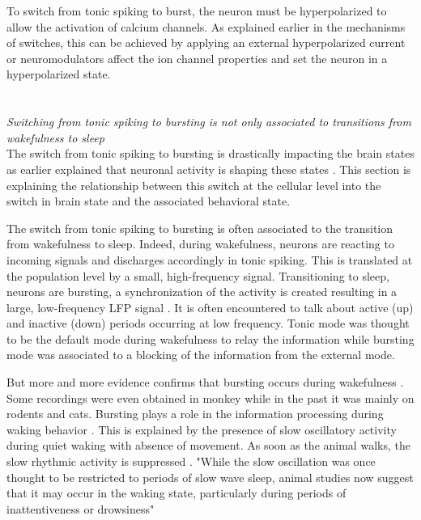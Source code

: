 To switch from tonic spiking to burst, the neuron must be hyperpolarized to allow the activation of calcium channels. As explained earlier in the mechanisms of switches, this can be achieved by applying an external hyperpolarized current or neuromodulators affect the ion channel properties and set the neuron in a hyperpolarized state. \\
~\\
~\\
\textit{Switching from tonic spiking to bursting is not only associated to transitions from wakefulness to sleep}\\
The switch from tonic spiking to bursting is drastically impacting the brain states as earlier explained that neuronal activity is shaping these states \citep{takahashi_neuronal_2006}. This section is explaining the relationship between this switch at the cellular level into the switch in brain state and the associated behavioral state. 

The switch from tonic spiking to bursting is often associated to the transition from wakefulness to sleep. Indeed, during wakefulness, neurons are reacting to incoming signals and discharges accordingly in tonic spiking. This is translated at the population level by a small, high-frequency signal. Transitioning to sleep, neurons are bursting, a synchronization of the activity is created resulting in a large, low-frequency LFP signal \citep{mccormick_sleep_1997}. It is often encountered to talk about active (up) and inactive (down) periods occurring at low frequency. Tonic mode was thought to be the default mode during wakefulness to relay the information while bursting mode was associated to a blocking of the information from the external mode. 

But more and more evidence confirms that bursting occurs during wakefulness \citep{fanselow_thalamic_2001, steriade_natural_2001, zagha_edward_mccormick_neural_2014, reimer_pupil_2014}. Some recordings were even obtained in monkey \citep{guillery_thalamic_2002} while in the past it was mainly on rodents and cats. Bursting plays a role in the information processing during waking behavior \citep{sherman_tonic_2001,ramcharan_burst_2000}. This is explained by the presence of slow oscillatory activity during quiet waking with absence of movement. As soon as the animal walks, the slow rhythmic activity is suppressed \citep{mccormick_brain_2015}. "While the slow oscillation was once thought to be restricted to periods of slow wave sleep, animal studies now suggest that it may occur in the waking state, particularly during periods of inattentiveness or drowsiness"
 
